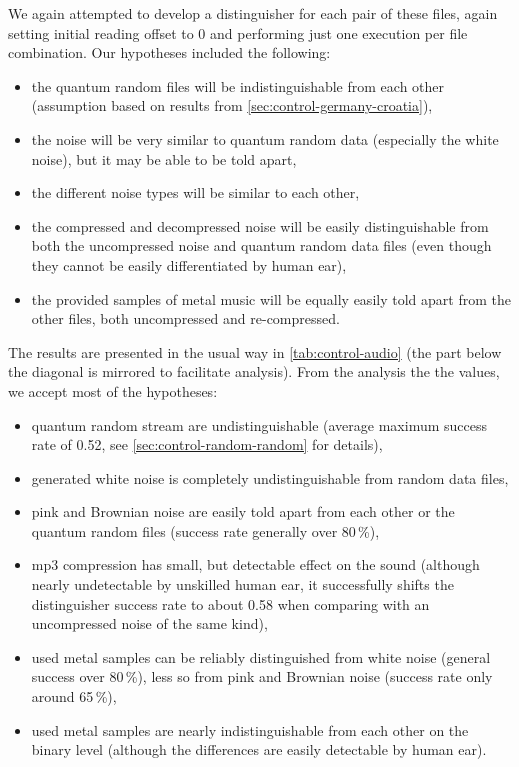 \documentclass[12pt,oneside]{fithesis2}		%
\renewcommand{\_}{\leavevmode \kern0.0em\vbox{\hrule width0.4em}}
\newcommand{\squarebullet}{\textcolor{black}{\raisebox{0.15em}{\rule{4pt}{4pt}}}}
\newenvironment{myItemize}{
  \begin{itemize}[leftmargin=2em,rightmargin=1em,itemsep=\parskip ,parsep=0em,topsep=0em,partopsep=0em]
  \renewcommand{\labelitemi}{\squarebullet}
  \renewcommand{\labelitemii}{$\diamond$}
}{
  \end{itemize}
}
\begin{document}
We again attempted to develop a distinguisher for each pair of these files, again setting initial reading offset to 0
and performing just one execution per file combination. Our hypotheses included the following:
\begin{myItemize}
\item the quantum random files will be indistinguishable from each other (assumption based on results from 
\autoref{sec:control-germany-croatia}),
\item the noise will be very similar to quantum random data (especially the white noise), but it may be able to be told apart,
\item the different noise types will be similar to each other,
\item the compressed and decompressed noise will be easily distinguishable from both the uncompressed noise and quantum random data
files (even though they cannot be easily differentiated by human ear),
\item the provided samples of metal music will be equally easily told apart from the other files, both uncompressed and re-compressed.
\end{myItemize}

\noindent
The results are presented in the usual way in \autoref{tab:control-audio} (the part below the diagonal is mirrored to
facilitate analysis). From the analysis the the values, we accept most of the hypotheses:
\begin{myItemize}
\item quantum random stream are undistinguishable (average maximum success rate of 0.52, see \autoref{sec:control-random-random}
for details),
\item generated white noise is completely undistinguishable from random data files,
\item pink and Brownian noise are easily told apart from each other or the quantum random files (success rate generally over 80\,\%),
\item mp3 compression has small, but detectable effect on the sound (although nearly undetectable by unskilled human ear, 
it successfully shifts the distinguisher success rate to about 0.58 when comparing with an uncompressed noise of the same kind),
\item used metal samples can be reliably distinguished from white noise (general success over 80\,\%), 
less so from pink and Brownian noise (success rate only around 65\,\%),
\item used metal samples are nearly indistinguishable from each other on the binary level 
(although the differences are easily detectable by human ear).
\end{myItemize}
\end{document}
